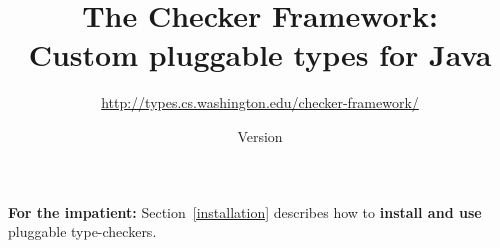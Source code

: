 \documentclass[10pt]{report}
\title{The Checker Framework: \\ Custom pluggable types for Java}
\author{%
\url{http://types.cs.washington.edu/checker-framework/}}
\date{Version \ReleaseInfo{}}
\def\codesize{\relax}           %
\newcommand{\code}[1]{\ifmmode{\mbox{\codesize\ttfamily{#1}}}\else{\codesize\ttfamily #1}\fi}
\def\<#1>{\code{#1}}
\begin{document}
\maketitle


  \let\Itemize =\itemize
  \let\Enumerate =\enumerate
  \let\Description =\description
  \def\Nospacing{\itemsep=0pt\topsep=0pt\partopsep=0pt\parskip=0pt\parsep=0pt}
  \renewenvironment{itemize}{\Itemize\Nospacing}{\endlist}
  \renewenvironment{enumerate}{\Enumerate\Nospacing}{\endlist}
  \renewenvironment{description}{\Description\Nospacing}{\endlist}

  \makeatletter
  \def\topfigrule{\kern3\p@ \hrule \kern -3.4\p@} %
  \def\botfigrule{\kern-3\p@ \hrule \kern 2.6\p@} %
  \def\dblfigrule{\kern3\p@ \hrule \kern -3.4\p@} %
  \makeatother


\newcommand{\refclass}[2]{\ahref{doc/checkers/#1/#2.html}{\<#2>}}
\newcommand{\refmethod}[4]{\ahref{doc/checkers/#1/#2.html\##3#4}{\<#2.#3>}}
\newcommand{\sunjavadoc}[2]{\ahref{http://java.sun.com/javase/6/docs/api/#1}{\<#2>}}

\setcounter{page}{2}

\noindent
\textbf{For the impatient:}
Section~\ref{installation} describes how to \textbf{install and use} pluggable
type-checkers.
\end{document}
